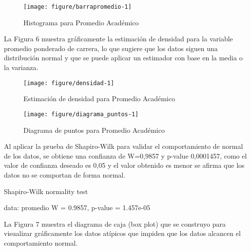 \documentclass[conference]{IEEEtran}\usepackage[]{graphicx}\usepackage[]{color}
\makeatletter
\def\maxwidth{ %
  \ifdim\Gin@nat@width>\linewidth
    \linewidth
  \else
    \Gin@nat@width
  \fi
}
\makeatother
\begin{document}
\begin{itemize}
	\begin{figure}[ht]
		\centering

\texttt{[image: figure/barrapromedio-1]} 

		\caption{Histograma para Promedio Académico}
		\label{fig:barras_promedio_frecuencias_clase}
	\end{figure}


	La Figura 6 muestra gráficamente la estimación de densidad para la variable promedio ponderado de carrera, lo que sugiere que los datos siguen una distribución normal y que se puede aplicar un estimador con base en la media o la varianza. 
	\begin{figure}[ht]
		\centering

\texttt{[image: figure/densidad-1]} 

		\caption{Estimación de densidad para Promedio Académico}
		\label{fig:estimacion_frecuencia:promedio}
	\end{figure}

	\begin{figure}[ht]
		\centering

\texttt{[image: figure/diagrama\_puntos-1]} 

		\caption{Diagrama de puntos para Promedio Académico}
		\label{fig:diagrama_puntos}
	\end{figure}

	Al aplicar la prueba de Shapiro-Wilk para validar el comportamiento de normal de los datos, se obtiene una confianza de W=0,9857 y p-value 0,0001457, como el valor de confianza deseado es 0,05 y el valor obtenido es menor se afirma que los datos no se comportan de forma normal.
	
	\begin{center}
		\bigskip

	Shapiro-Wilk normality test

data:  promedio
W = 0.9857, p-value = 1.457e-05


	\end{center}
			
	\bigskip
	La Figura 7 muestra el diagrama de caja (box plot) que se construyo para visualizar gráficamente los datos atípicos que impiden que los datos alcancen el comportamiento normal.
		

\end{itemize}
\end{document}
